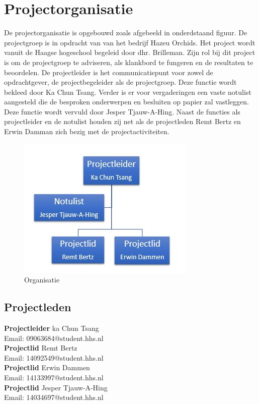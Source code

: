 
\section{Projectorganisatie}

De projectorganisatie is opgebouwd zoals afgebeeld in onderdstaand figuur. De projectgroep is in opdracht van van het bedrijf Hazeu Orchids.
Het project wordt vanuit de Haagse hogeschool begeleid door dhr. Brilleman. Zijn rol bij
dit project is om de projectgroep te adviseren, als klankbord te fungeren en de resultaten
te beoordelen. De projectleider is het communicatiepunt voor zowel de opdrachtgever, de
projectbegeleider als de projectgroep. Deze functie wordt bekleed door Ka Chun Tsang.
Verder is er voor vergaderingen een vaste notulist aangesteld die de besproken onderwerpen
en besluiten op papier zal vastleggen. Deze functie wordt vervuld door Jesper Tjauw-A-Hing.
Naast de functies als projectleider en de notulist houden zij net als de projectleden Remt Bertz en Erwin Damman zich bezig met de projectactiviteiten.

\begin{figure}[h]
	\centering
	\includegraphics[width=\textwidth]{Afbeeldingen/Organisatie.JPG}
	\caption{Organisatie} 
\end{figure}
\newpage

\subsection{Projectleden}

\textbf{Projectleider}
ka Chun Tsang\\
Email: 09063684@student.hhs.nl\\[0.5cm]

\textbf{Projectlid}
Remt Bertz\\
Email: 14092549@student.hhs.nl\\[0.5cm]

\textbf{Projectlid}
Erwin Dammen\\
Email: 14133997@student.hhs.nl\\[0.5cm]

\textbf{Projectlid}
Jesper Tjauw-A-Hing\\
Email: 14034697@student.hhs.nl\\[0.5cm]

\newpage

